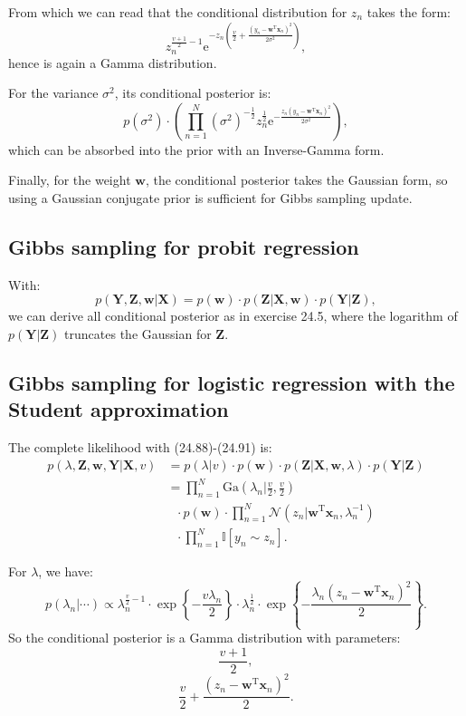 \documentclass[UTF8]{ctexart}
\begin{document}
From which we can read that the conditional distribution for $z_{n}$ takes the form:
$$z_{n}^{\frac{v+1}{2}-1}\text{e}^{-z_{n}(\frac{v}{2}+\frac{(y_{n}-\textbf{w}^{\text{T}}\textbf{x}_{n})^{2}}{2\sigma^{2}})},$$
hence is again a Gamma distribution.

For the variance $\sigma^{2}$, its conditional posterior is:
$$p(\sigma^{2})\cdot \left(\prod_{n=1}^{N}(\sigma^{2})^{-\frac{1}{2}}z_{n}^{\frac{1}{2}}\text{e}^{-\frac{z_{n}(y_{n}-\textbf{w}^{\text{T}}\textbf{x}_{n})^{2}}{2\sigma^{2}}} \right),$$
which can be absorbed into the prior with an Inverse-Gamma form.

Finally, for the weight $\textbf{w}$, the conditional posterior takes the Gaussian form, so using a Gaussian conjugate prior is sufficient for Gibbs sampling update.

\subsection{Gibbs sampling for probit regression}
With:
$$p(\textbf{Y},\textbf{Z},\textbf{w}|\textbf{X})=p(\textbf{w})\cdot p(\textbf{Z}|\textbf{X},\textbf{w})\cdot p(\textbf{Y}|\textbf{Z}),$$
we can derive all conditional posterior as in exercise 24.5, where the logarithm of $p(\textbf{Y}|\textbf{Z})$ truncates the Gaussian for $\textbf{Z}$. 

\subsection{Gibbs sampling for logistic regression with the Student approximation}
The complete likelihood with (24.88)-(24.91) is:
$$
\begin{aligned}
p(\lambda,\textbf{Z},\textbf{w},\textbf{Y}|\textbf{X},v)&= p(\lambda|v)\cdot p(\textbf{w})\cdot p(\textbf{Z}|\textbf{X},\textbf{w},\lambda)\cdot p(\textbf{Y}|\textbf{Z})\\
&=\prod_{n=1}^{N}\text{Ga}(\lambda_{n}|\frac{v}{2},\frac{v}{2})\\
&\ \ \ \cdot p(\textbf{w})\cdot \prod_{n=1}^{N}\mathcal{N}(z_{n}|\textbf{w}^{\text{T}}\textbf{x}_{n},\lambda^{-1}_{n})\\
&\ \ \ \cdot \prod_{n=1}^{N}\mathbb{I}[y_{n}\sim z_{n}].
\end{aligned}
$$

For $\lambda$, we have:
$$p(\lambda_{n}|\cdots)\propto \lambda_{n}^{\frac{v}{2}-1}\cdot\exp\left\{-\frac{v\lambda_{n}}{2} \right\}\cdot \lambda_{n}^{\frac{1}{2}}\cdot \exp\left\{-\frac{\lambda_{n}(z_{n}-\textbf{w}^{\text{T}}\textbf{x}_{n})^{2}}{2} \right\}.$$
So the conditional posterior is a Gamma distribution with parameters:
$$\frac{v+1}{2},$$
$$\frac{v}{2}+\frac{(z_{n}-\textbf{w}^{\text{T}}\textbf{x}_{n})^{2}}{2}.$$
\end{document}
